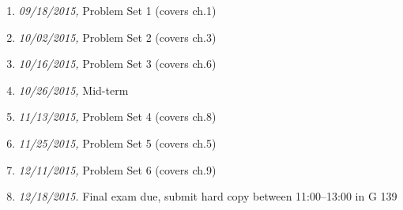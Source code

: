 \documentclass[11pt,article,oneside]{memoir}
\begin{document}
\begin{enumerate}
\item \textit{09/18/2015,} Problem Set 1 (covers ch.1)
\item \textit{10/02/2015,} Problem Set 2 (covers ch.3)
\item \textit{10/16/2015,} Problem Set 3 (covers ch.6)
\item \textit{10/26/2015,} Mid-term 
\item \textit{11/13/2015,} Problem Set 4 (covers ch.8)
\item \textit{11/25/2015,} Problem Set 5 (covers ch.5)
\item \textit{12/11/2015,} Problem Set 6 (covers ch.9)
\item \textit{12/18/2015.} Final exam due, submit hard copy between 11:00--13:00 in G 139 
\end{enumerate}


\end{document}
